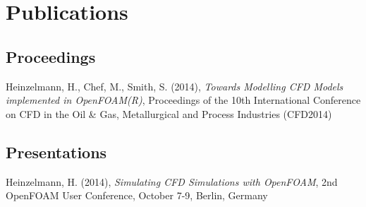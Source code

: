 \chapter*{Publications}
\label{cap:publications}
\section*{Proceedings}

\noindent
Heinzelmann, H., Chef, M., Smith, S. (2014), \emph{Towards Modelling CFD Models 
implemented in OpenFOAM(R)}, Proceedings of the 10th International Conference on CFD 
in the Oil \& Gas, Metallurgical and Process Industries (CFD2014)
\vspace{1ex}



\section*{Presentations}

\noindent
Heinzelmann, H. (2014), \emph{Simulating CFD Simulations with OpenFOAM}, 
2nd OpenFOAM User Conference, October 7-9, Berlin, Germany
\vspace{1ex}


